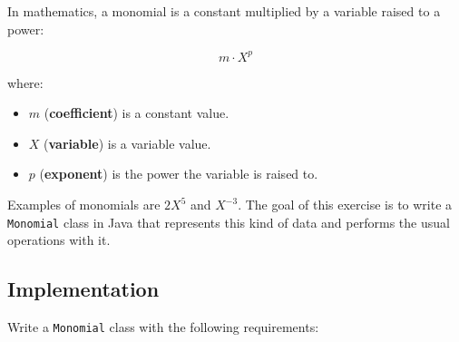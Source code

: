 In mathematics, a monomial is a constant multiplied by a variable raised to a power:

\[
    m \cdot X^{p}
\]

where:

\begin{itemize}

    \item \(m\) (\textbf{coefficient}) is a constant value.

    \item \(X\) (\textbf{variable}) is a variable value.

    \item \(p\) (\textbf{exponent}) is the power the variable is raised to.

\end{itemize}

Examples of monomials are \(2X^{5}\) and \(X^{-3}\). The goal of this exercise is to write a \texttt{Monomial} class in Java that represents this kind of data and performs the usual operations with it.

\subsection{Implementation}

Write a \texttt{Monomial} class with the following requirements:

